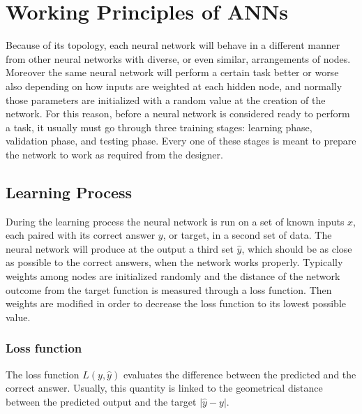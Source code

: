 \section{Working Principles of ANNs}
\label{sec:Working_Principles_of_ANNs}
Because of its topology, each neural network will behave in a different manner from other neural networks with diverse, or even similar, arrangements of nodes.
Moreover the same neural network will perform a certain task better or worse also depending on how inputs are weighted at each hidden node, and normally those parameters are initialized with a random value at the creation of the network.
For this reason, before a neural network is considered ready to perform a task, it usually must go through three training stages: learning phase, validation phase, and testing phase.
Every one of these stages is meant to prepare the network to work as required from the designer.

\subsection{Learning Process}
\label{ssec:Learning_Process}
During the learning process the neural network is run on a set of known inputs $x$, each paired with its correct answer $y$, or target, in a second set of data.
The neural network will produce at the output a third set $\hat{y}$, which should be as close as possible to the correct answers, when the network works properly.
Typically weights among nodes are initialized randomly and the distance of the network outcome from the target function is measured through a loss function.
Then weights are modified in order to decrease the loss function to its lowest possible value. %

\subsubsection{Loss function}
\label{sssec:Loss_function}
The loss function $L(y, \hat{y})$ evaluates the difference between the predicted and the correct answer.
Usually, this quantity is linked to the geometrical distance between the predicted output and the target $\left| \hat{y}-y \right|$.

